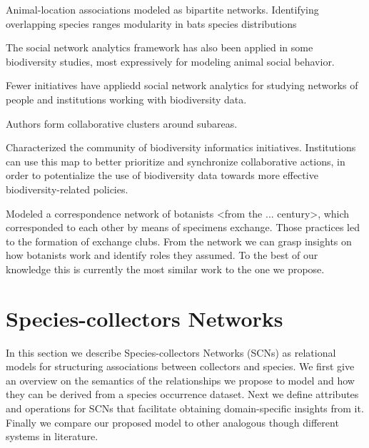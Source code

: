 


Animal-location associations modeled as bipartite networks.
Identifying overlapping species ranges
modularity in bats species distributions  
\cite{Thebault2013}

The social network analytics framework has also been applied in some biodiversity studies, most expressively for modeling animal social behavior.

Fewer initiatives have appliedd social network analytics for studying networks of people and institutions working with biodiversity data. 


Authors form collaborative clusters around subareas.
\cite{Borrett2014}

Characterized the community of biodiversity informatics initiatives. 
Institutions can use this map to better prioritize and synchronize collaborative actions, in order to potentialize the use of biodiversity data towards more effective biodiversity-related policies.
\cite{Bingham2017}

Modeled a correspondence network of botanists <from the ... century>, which corresponded to each other by means of specimens exchange.
Those practices led to the formation of exchange clubs.
From the network we can grasp insights on how botanists work and identify roles they assumed. 
\cite{Groom2014}
To the best of our knowledge this is currently the most similar work to the one we propose.






\section{Species-collectors Networks}

In this section we describe Species-collectors Networks (SCNs) as relational models for structuring associations between collectors and species.
We first give an overview on the semantics of the relationships we propose to model and how they can be derived from a species occurrence dataset.
Next we define attributes and operations for SCNs that facilitate obtaining domain-specific insights from it.
Finally we compare our proposed model to other analogous though different systems in literature.

